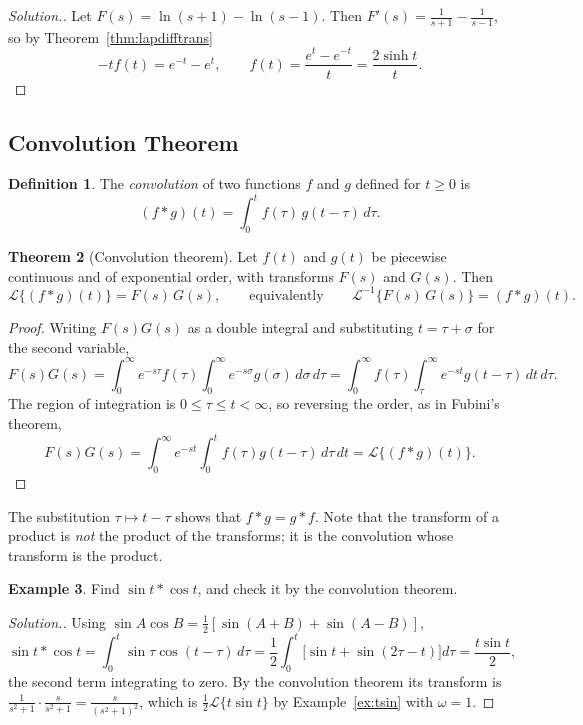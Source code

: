 \documentclass[11pt,a4paper]{article}
\theoremstyle{definition}
\newtheorem{thm}{Theorem}[subsection]
\newtheorem{defn}[thm]{Definition}
\newtheorem{exa}[thm]{Example}
\newenvironment{solution}
  {\renewcommand{\qedsymbol}{}\begin{proof}[\textit{Solution}.]}
  {\end{proof}}
\begin{document}
\begin{solution}
Let $F(s) = \ln(s + 1) - \ln(s - 1)$. Then $F'(s) = \frac{1}{s + 1} - \frac{1}{s
- 1}$, so by Theorem~\ref{thm:lapdifftrans}
\[-tf(t) = e^{-t} - e^t,\qquad f(t) = \frac{e^t - e^{-t}}{t} = \frac{2\sinh
t}{t} .\]
\end{solution}

{\color[wave]{485}\subsection{Convolution Theorem}}

\begin{defn}
\label{defn:convolution}
The \emph{convolution} of two functions $f$ and $g$ defined for $t\geq 0$ is
\[(f*g)(t) = \int^t_0 f(\tau)\, g(t-\tau)\, d \tau .\]
\end{defn}

\begin{thm}[Convolution theorem]
\label{thm:convolution}
Let $f(t)$ and $g(t)$ be piecewise continuous and of exponential order, with
transforms $F(s)$ and $G(s)$. Then
\[\mathcal{L}\{(f*g)(t)\} = F(s)\,G(s),\qquad\text{equivalently}\qquad
\mathcal{L}^{-1}\{F(s)\,G(s)\} = (f*g)(t) .\]
\end{thm}

\begin{proof}
Writing $F(s)G(s)$ as a double integral and substituting $t = \tau + \sigma$
for the second variable,
\[F(s)G(s) = \int_0^\infty e^{-s\tau}f(\tau)\int_0^\infty e^{-s\sigma}g(\sigma)\,
d\sigma\,d\tau = \int_0^\infty f(\tau)\int_\tau^\infty e^{-st}g(t - \tau)\,dt\,
d\tau .\]
The region of integration is $0\leq\tau\leq t<\infty$, so reversing the order,
as in Fubini's theorem,
\[F(s)G(s) = \int_0^\infty e^{-st}\int_0^t f(\tau)g(t - \tau)\,d\tau\,dt =
\mathcal{L}\{(f*g)(t)\} .\]
\end{proof}

The substitution $\tau\mapsto t - \tau$ shows that $f*g = g*f$. Note that the
transform of a product is \emph{not} the product of the transforms; it is the
convolution whose transform is the product.

\begin{exa}
\label{ex:convolutionsincos}
Find $\sin t * \cos t$, and check it by the convolution theorem.
\end{exa}

\begin{solution}
Using $\sin A\cos B = \frac12[\sin(A + B) + \sin(A - B)]$,
\[\sin t * \cos t = \int^t_0 \sin \tau \cos (t - \tau)\, d\tau =
\frac12\int_0^t\big[\sin t + \sin(2\tau - t)\big]d\tau = \frac{t\sin t}{2} ,\]
the second term integrating to zero. By the convolution theorem its transform
is $\frac{1}{s^2 + 1}\cdot\frac{s}{s^2 + 1} = \frac{s}{(s^2 + 1)^2}$, which is
$\frac12\mathcal{L}\{t\sin t\}$ by Example~\ref{ex:tsin} with $\omega = 1$.
\end{solution}
\end{document}

